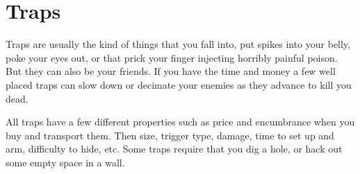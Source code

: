 

\section*{Traps}

Traps are usually the kind of things that you fall into, put spikes into your belly, poke your eyes out, or that prick your finger injecting horribly painful poison. But they can also be your friends. If you have the time and money a few well placed traps can slow down or decimate your enemies as they advance to kill you dead.

All traps have a few different properties such as price and encumbrance when you buy and transport them. Then size, trigger type, damage, time to set up and arm, difficulty to hide, etc. Some traps require that you dig a hole, or hack out some empty space in a wall.

\

